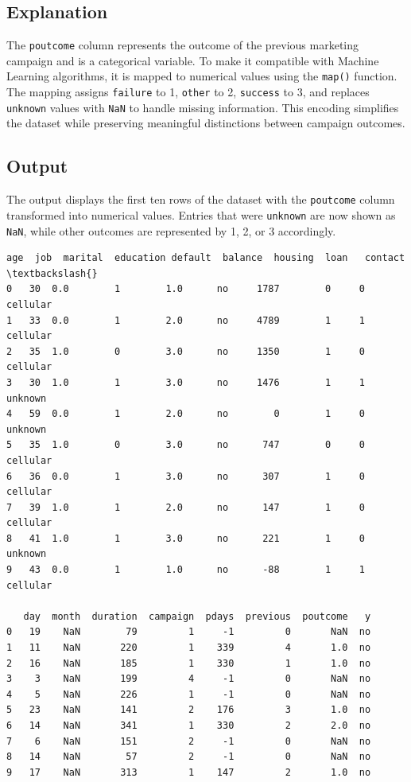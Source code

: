 \documentclass[11pt,a4paper]{report}
\makeatletter
\newcommand{\boxspacing}{\kern\kvtcb@left@rule\kern\kvtcb@boxsep}
\newcommand{\prompt}[4]{
        {\ttfamily\llap{{\color{#2}[#3]:\hspace{3pt}#4}}\vspace{-\baselineskip}}
    }
\makeatother
\begin{document}
\subsection*{Explanation}
The \texttt{poutcome} column represents the outcome of the previous marketing campaign and is a categorical variable. To make it compatible with Machine Learning algorithms, it is mapped to numerical values using the \texttt{map()} function. The mapping assigns \texttt{failure} to 1, \texttt{other} to 2, \texttt{success} to 3, and replaces \texttt{unknown} values with \texttt{NaN} to handle missing information. This encoding simplifies the dataset while preserving meaningful distinctions between campaign outcomes.

\subsection*{Output}
The output displays the first ten rows of the dataset with the \texttt{poutcome} column transformed into numerical values. Entries that were \texttt{unknown} are now shown as \texttt{NaN}, while other outcomes are represented by 1, 2, or 3 accordingly.
            \begin{tcolorbox}[breakable, size=fbox, boxrule=.5pt, pad at break*=1mm, opacityfill=0]
\prompt{Out}{outcolor}{15}{\boxspacing}
\begin{Verbatim}[commandchars=\\\{\}]
   age  job  marital  education default  balance  housing  loan   contact  \textbackslash{}
0   30  0.0        1        1.0      no     1787        0     0  cellular
1   33  0.0        1        2.0      no     4789        1     1  cellular
2   35  1.0        0        3.0      no     1350        1     0  cellular
3   30  1.0        1        3.0      no     1476        1     1   unknown
4   59  0.0        1        2.0      no        0        1     0   unknown
5   35  1.0        0        3.0      no      747        0     0  cellular
6   36  0.0        1        3.0      no      307        1     0  cellular
7   39  1.0        1        2.0      no      147        1     0  cellular
8   41  1.0        1        3.0      no      221        1     0   unknown
9   43  0.0        1        1.0      no      -88        1     1  cellular

   day  month  duration  campaign  pdays  previous  poutcome   y
0   19    NaN        79         1     -1         0       NaN  no
1   11    NaN       220         1    339         4       1.0  no
2   16    NaN       185         1    330         1       1.0  no
3    3    NaN       199         4     -1         0       NaN  no
4    5    NaN       226         1     -1         0       NaN  no
5   23    NaN       141         2    176         3       1.0  no
6   14    NaN       341         1    330         2       2.0  no
7    6    NaN       151         2     -1         0       NaN  no
8   14    NaN        57         2     -1         0       NaN  no
9   17    NaN       313         1    147         2       1.0  no
\end{Verbatim}
\end{tcolorbox}
        
\end{document}
